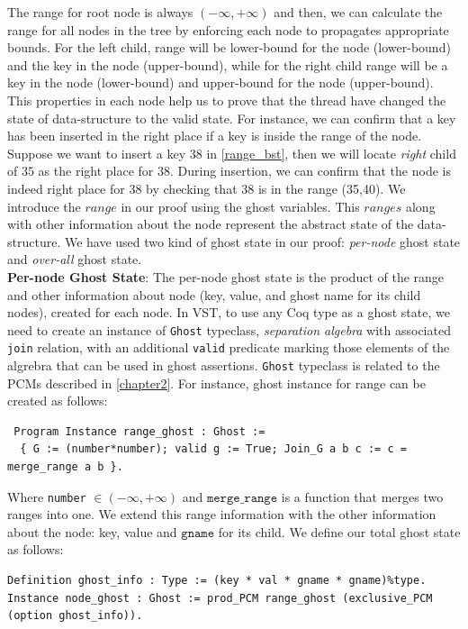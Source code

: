 \documentclass[acmsmall,screen]{acmart}\settopmatter{printfolios=true}
\begin{document}
The range for root node is always $(-\infty,+\infty)$ and then, we can calculate the range for all nodes in the tree by enforcing each node to propagates appropriate bounds. For the left child, range will be lower-bound for the node (lower-bound) and the key in the node (upper-bound), while for the right child range will be a key in the node (lower-bound) and upper-bound for the node (upper-bound). This properties in each node help us to prove that the thread have changed the state of data-structure to the valid state. For instance, we can confirm that a key has been inserted in the right place if a key is inside the range of the node. Suppose we want to insert a key $38$ in \ref{range_bst}, then we will locate \emph{right} child of $35$ as the right place for $38$. During insertion, we can confirm that the node is indeed right place for $38$ by checking that $38$ is in the range (35,40). We introduce the $range$ in our proof using the ghost variables. This $ranges$ along with other information about the node represent the abstract state of the data-structure. We have used two kind of ghost state in our proof: \emph{per-node} ghost state and \emph{over-all} ghost state.\\
\textbf{Per-node Ghost State}: The per-node ghost state is the product of the range and other information about node (key, value, and ghost name for its child nodes), created for each node. In VST, to use any Coq type as a ghost state, we need to create an instance of \texttt{Ghost} typeclass, \emph{separation algebra} with associated \texttt{join} relation, with an additional \texttt{valid} predicate marking those elements of the algrebra that can be used in ghost assertions. \texttt{Ghost} typeclass is related to the PCMs described in \ref{chapter2}. For instance, ghost instance for range can be created as follows:
\begin{verbatim}
 Program Instance range_ghost : Ghost :=
  { G := (number*number); valid g := True; Join_G a b c := c =  merge_range a b }.
\end{verbatim}
Where \texttt{number} $\in (-\infty,+\infty)$ and $\texttt{merge\_range}$ is a function that merges two ranges into one. We extend this range information with the other information about the node: key, value and $\texttt{gname}$ for its child. We define our total ghost state as follows:
\begin{verbatim}
Definition ghost_info : Type := (key * val * gname * gname)%type.
Instance node_ghost : Ghost := prod_PCM range_ghost (exclusive_PCM (option ghost_info)).
\end{verbatim}
\end{document}
